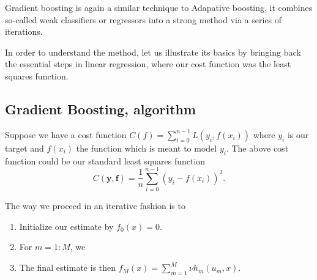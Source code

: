 \documentclass[%
oneside,                 %
final,                   %
10pt]{article}
\begin{document}
Gradient boosting is again a similar technique to Adapative boosting,
it combines so-called weak classifiers or regressors into a strong
method via a series of iterations.

In order to understand the method, let us illustrate its basics by
bringing back the essential steps in linear regression, where our cost
function was the least squares function.

\subsection*{Gradient Boosting, algorithm}

Suppose we have a cost function $C(f)=\sum_{i=0}^{n-1}L(y_i, f(x_i))$ where $y_i$ is our target and $f(x_i)$ the function which is meant to model $y_i$. The above cost function could be our standard least squares  function
\[
C(\bm{y},\bm{f})=\frac{1}{n}\sum_{i=0}^{n-1}(y_i-f(x_i))^2.
\]

The way we proceed in an iterative fashion is to
\begin{enumerate}
\item Initialize our estimate by $f_0(x)=0$.

\item For $m=1:M$, we

\noindent
\item The final estimate is then $f_M(x) = \sum_{m=1}^M\nu h_m(u_m,x)$.
\end{enumerate}

\noindent
\end{document}
